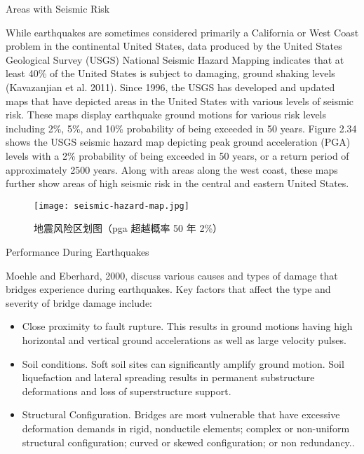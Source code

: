 Areas with Seismic Risk

While earthquakes are sometimes considered primarily a California or West Coast problem in the continental
United States, data produced by the United States Geological Survey (USGS) National Seismic Hazard Mapping
indicates that at least 40\% of the United States is subject to damaging, ground shaking levels (Kavazanjian et al.
2011). Since 1996, the USGS has developed and updated maps that have depicted areas in the United States with various levels of seismic risk. These maps display earthquake ground motions for various risk levels including 2\%,
5\%, and 10\% probability of being exceeded in 50 years. Figure 2.34 shows the USGS seismic hazard map depicting
peak ground acceleration (PGA) levels with a 2\% probability of being exceeded in 50 years, or a return period of
approximately 2500 years. Along with areas along the west coast, these maps further show areas of high seismic risk
in the central and eastern United States.

\begin{figure}
  \texttt{[image: seismic-hazard-map.jpg]}
  \caption{地震风险区划图（\acrfull*{pga} 超越概率 50 年 2\%） }
  \label{fig:seismic-hazard-map}
\end{figure}

Performance During Earthquakes

Moehle and Eberhard, 2000, discuss various causes and types of damage that bridges experience during
earthquakes. Key factors that affect the type and severity of bridge damage include:

\begin{itemize}
  \item Close proximity to fault rupture. This results in ground motions having high horizontal and vertical ground accelerations as well as large velocity pulses.
  \item Soil conditions. Soft soil sites can significantly amplify ground motion. Soil liquefaction and lateral spreading results in permanent substructure deformations and loss of superstructure support.
  \item Structural Configuration. Bridges are most vulnerable that have excessive deformation demands in rigid,
  nonductile elements; complex or non-uniform structural configuration; curved or skewed configuration; or non redundancy..
\end{itemize}


